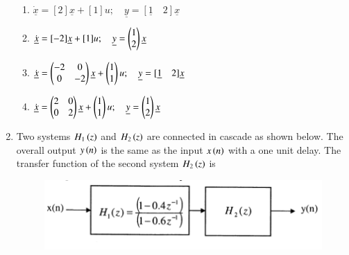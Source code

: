 \documentclass[a4paper, 11pt]{article}
\begin{document}
\begin{enumerate}
    \begin{enumerate}
        \item $\dot{\underline{x}}=[2]\underline{x}+[1]u; \quad \underline{y}=[\underline{1} \quad 2]\underline{x}$
        \item $\dot{\underline{x}}=[-2]\underline{x}+[1]u; \quad \underline{y}=\begin{pmatrix}1 \\ 2\end{pmatrix}\underline{x}$
        \item $\dot{\underline{x}}=\begin{pmatrix}-2 & 0 \\ 0 & -2\end{pmatrix}\underline{x}+\begin{pmatrix}1 \\ 1\end{pmatrix}u; \quad \underline{y}=[\underline{1} \quad 2]\underline{x}$
        \item $\dot{\underline{x}}=\begin{pmatrix}2 & 0 \\ 0 & 2\end{pmatrix}\underline{x}+\begin{pmatrix}1 \\ 1\end{pmatrix}u; \quad \underline{y}=\begin{pmatrix}1 \\ 2\end{pmatrix}\underline{x}$
    \end{enumerate}

    \hfill{}

    \item Two systems $H_{1}\left(z\right)$ and $H_{2}\left(z\right)$ are connected in cascade as shown below. The overall output $y\left(n\right)$ is the same as the input $x\left(n\right)$ with a one unit delay. The transfer function of the second system $H_{2}\left(z\right)$ is
    
    \begin{figure}[H]
        \centering
        \includegraphics[width=0.8\columnwidth]{figs/q29.png}
        \caption*{}
        \label{fig:q29}
    \end{figure}
    
    \begin{enumerate}
    \end{enumerate}
    

\end{enumerate}
\end{document}
